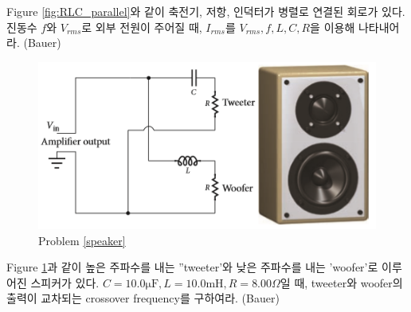 \begin{problem}\label{RLC_parallel}

Figure \ref{fig:RLC_parallel}와 같이 축전기, 저항, 인덕터가 병렬로 연결된 회로가 있다. 진동수 $f$와 $V_{rms}$로 외부 전원이 주어질 때, $I_{rms}$를 $V_{rms}, f, L, C, R$을 이용해 나타내어라. (Bauer)
\end{problem}
\begin{figure}[h!]
\centering\includegraphics[scale=0.8]{Pictures/speaker.PNG}
\caption{Problem \ref{speaker}}
\label{fig:speaker}
\end{figure}

\begin{problem}\label{speaker}
Figure \ref{fig:speaker}과 같이 높은 주파수를 내는 ''tweeter'와 낮은 주파수를 내는 'woofer'로 이루어진 스피커가 있다. $C=10.0\mathrm{\mu F}, L=10.0\mathrm{mH}, R=8.00\Omega$일 때, tweeter와 woofer의 출력이 교차되는 crossover frequency를 구하여라. (Bauer)
\end{problem}